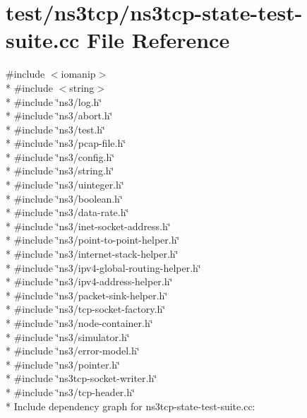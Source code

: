 \hypertarget{ns3tcp-state-test-suite_8cc}{}\section{test/ns3tcp/ns3tcp-\/state-\/test-\/suite.cc File Reference}
\label{ns3tcp-state-test-suite_8cc}
{\ttfamily \#include $<$iomanip$>$}\\*
{\ttfamily \#include $<$string$>$}\\*
{\ttfamily \#include \char`\"{}ns3/log.\+h\char`\"{}}\\*
{\ttfamily \#include \char`\"{}ns3/abort.\+h\char`\"{}}\\*
{\ttfamily \#include \char`\"{}ns3/test.\+h\char`\"{}}\\*
{\ttfamily \#include \char`\"{}ns3/pcap-\/file.\+h\char`\"{}}\\*
{\ttfamily \#include \char`\"{}ns3/config.\+h\char`\"{}}\\*
{\ttfamily \#include \char`\"{}ns3/string.\+h\char`\"{}}\\*
{\ttfamily \#include \char`\"{}ns3/uinteger.\+h\char`\"{}}\\*
{\ttfamily \#include \char`\"{}ns3/boolean.\+h\char`\"{}}\\*
{\ttfamily \#include \char`\"{}ns3/data-\/rate.\+h\char`\"{}}\\*
{\ttfamily \#include \char`\"{}ns3/inet-\/socket-\/address.\+h\char`\"{}}\\*
{\ttfamily \#include \char`\"{}ns3/point-\/to-\/point-\/helper.\+h\char`\"{}}\\*
{\ttfamily \#include \char`\"{}ns3/internet-\/stack-\/helper.\+h\char`\"{}}\\*
{\ttfamily \#include \char`\"{}ns3/ipv4-\/global-\/routing-\/helper.\+h\char`\"{}}\\*
{\ttfamily \#include \char`\"{}ns3/ipv4-\/address-\/helper.\+h\char`\"{}}\\*
{\ttfamily \#include \char`\"{}ns3/packet-\/sink-\/helper.\+h\char`\"{}}\\*
{\ttfamily \#include \char`\"{}ns3/tcp-\/socket-\/factory.\+h\char`\"{}}\\*
{\ttfamily \#include \char`\"{}ns3/node-\/container.\+h\char`\"{}}\\*
{\ttfamily \#include \char`\"{}ns3/simulator.\+h\char`\"{}}\\*
{\ttfamily \#include \char`\"{}ns3/error-\/model.\+h\char`\"{}}\\*
{\ttfamily \#include \char`\"{}ns3/pointer.\+h\char`\"{}}\\*
{\ttfamily \#include \char`\"{}ns3tcp-\/socket-\/writer.\+h\char`\"{}}\\*
{\ttfamily \#include \char`\"{}ns3/tcp-\/header.\+h\char`\"{}}\\*
Include dependency graph for ns3tcp-\/state-\/test-\/suite.cc\+:
